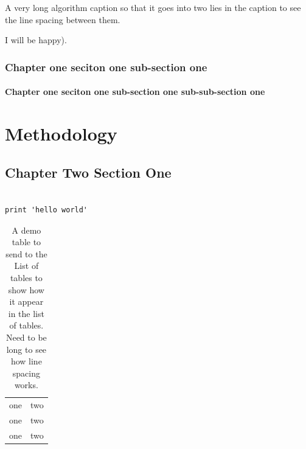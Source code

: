 \begin{algorithm}[htb!]
	\caption{A very long algorithm caption so that it goes into two lies in the caption to see the line spacing between them.}
	\begin{algorithmic}[1]
					\State I will be happy).
				\EndIf
	\end{algorithmic}
\end{algorithm}


\subsection{Chapter one seciton one sub-section one}
\subsubsection{Chapter one seciton one sub-section one sub-sub-section one}

\chapter{Methodology}
\section{Chapter Two Section One}

\begin{lstlisting}[float, caption={Python listing to demonstrate how it behaves in the list of listings. Note that under the title List of Listings, there are no subtitles Listing........ Page}, label=lst:node]

print 'hello world'
\end{lstlisting}


\begin{table}[htb!]
	\centering
	\caption{A demo table to send to the List of tables to show how it appear in the list of tables. Need to be long to see how line spacing works.}
	\begin{tabu}{ X[c]X[c] }
	 one & two \\
	 one & two \\
	 one & two \\
	\end{tabu}
\end{table}


